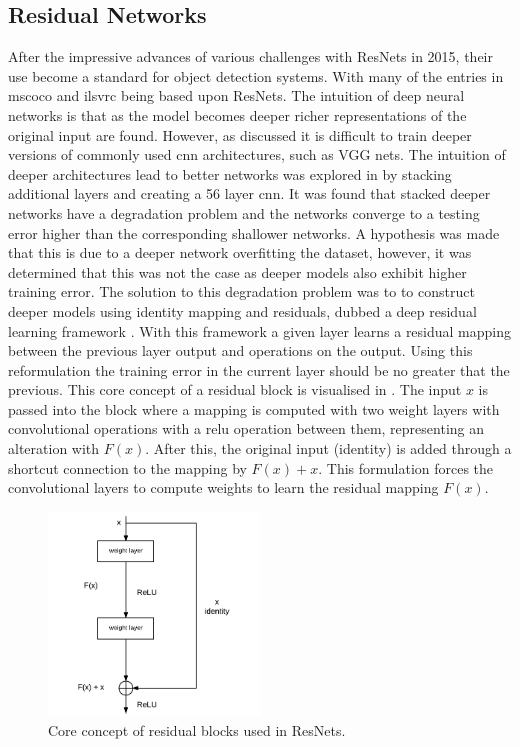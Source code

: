 \subsection{Residual Networks}
After the impressive advances of various challenges with ResNets in 2015, their use become a standard for object detection systems. With many of the entries in \gls{mscoco} and \gls{ilsvrc} being based upon ResNets. The intuition of deep neural networks is that as the model becomes deeper richer representations of the original input are found. However, as discussed it is difficult to train deeper versions of commonly used \gls{cnn} architectures, such as VGG nets. The intuition of deeper architectures lead to better networks was explored in \cite{deepres} by stacking additional layers and creating a 56 layer \gls{cnn}. It was found that stacked deeper networks have a degradation problem and the networks converge to a testing error higher than the corresponding shallower networks. A hypothesis was made that this is due to a deeper network overfitting the dataset, however, it was determined that this was not the case as deeper models also exhibit higher training error. The solution to this degradation problem was to to construct deeper models using identity mapping and residuals, dubbed a deep residual learning framework \cite{deepres}. With this framework a given layer learns a residual mapping between the previous layer output and operations on the output. Using this reformulation the training error in the current layer should be no greater that the previous. This core concept of a residual block is visualised in . The input $x$ is passed into the block where a mapping is computed with two weight layers with convolutional operations with a \gls{relu} operation between them, representing an alteration with $F(x)$. After this, the original input (identity) is added through a shortcut connection to the mapping by $F(x) + x$. This formulation forces the convolutional layers to compute weights to learn the residual mapping $F(x)$. 

\begin{figure}[H]
  \centering
    \includegraphics[width=0.5\textwidth]{Figs/Techanal/resblock.pdf}
    \caption{Core concept of residual blocks used in ResNets.}
    \label{fig:resblock}
\end{figure}

